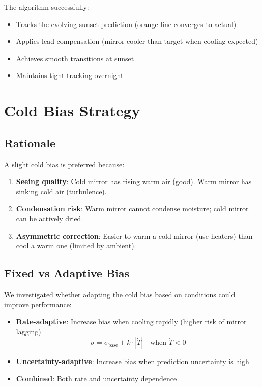 \documentclass[11pt,letterpaper]{article}
\begin{document}
The algorithm successfully:
\begin{itemize}
    \item Tracks the evolving sunset prediction (orange line converges to actual)
    \item Applies lead compensation (mirror cooler than target when cooling expected)
    \item Achieves smooth transitions at sunset
    \item Maintains tight tracking overnight
\end{itemize}

\section{Cold Bias Strategy}

\subsection{Rationale}

A slight cold bias is preferred because:
\begin{enumerate}
    \item \textbf{Seeing quality}: Cold mirror has rising warm air (good). Warm mirror has sinking cold air (turbulence).
    \item \textbf{Condensation risk}: Warm mirror cannot condense moisture; cold mirror can be actively dried.
    \item \textbf{Asymmetric correction}: Easier to warm a cold mirror (use heaters) than cool a warm one (limited by ambient).
\end{enumerate}

\subsection{Fixed vs Adaptive Bias}

We investigated whether adapting the cold bias based on conditions could improve performance:

\begin{itemize}
    \item \textbf{Rate-adaptive}: Increase bias when cooling rapidly (higher risk of mirror lagging)
    \begin{equation}
        \sigma = \sigma_\text{base} + k \cdot |\dot{T}| \quad \text{when } \dot{T} < 0
    \end{equation}
    \item \textbf{Uncertainty-adaptive}: Increase bias when prediction uncertainty is high
    \item \textbf{Combined}: Both rate and uncertainty dependence
\end{itemize}
\end{document}
